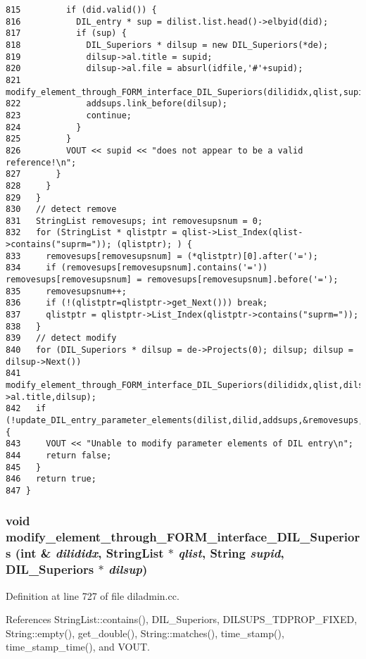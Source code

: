 \begin{verbatim}
815         if (did.valid()) {
816           DIL_entry * sup = dilist.list.head()->elbyid(did);
817           if (sup) {
818             DIL_Superiors * dilsup = new DIL_Superiors(*de);
819             dilsup->al.title = supid;
820             dilsup->al.file = absurl(idfile,'#'+supid);
821             modify_element_through_FORM_interface_DIL_Superiors(dilididx,qlist,supid,dilsup);
822             addsups.link_before(dilsup);
823             continue;
824           }
825         }
826         VOUT << supid << "does not appear to be a valid reference!\n";
827       }
828     }
829   }
830   // detect remove
831   StringList removesups; int removesupsnum = 0;
832   for (StringList * qlistptr = qlist->List_Index(qlist->contains("suprm=")); (qlistptr); ) {
833     removesups[removesupsnum] = (*qlistptr)[0].after('=');
834     if (removesups[removesupsnum].contains('=')) removesups[removesupsnum] = removesups[removesupsnum].before('=');
835     removesupsnum++;
836     if (!(qlistptr=qlistptr->get_Next())) break;
837     qlistptr = qlistptr->List_Index(qlistptr->contains("suprm="));
838   }
839   // detect modify
840   for (DIL_Superiors * dilsup = de->Projects(0); dilsup; dilsup = dilsup->Next())
841     modify_element_through_FORM_interface_DIL_Superiors(dilididx,qlist,dilsup->al.title,dilsup);
842   if (!update_DIL_entry_parameter_elements(dilist,dilid,addsups,&removesups,removesupsnum)) {
843     VOUT << "Unable to modify parameter elements of DIL entry\n";
844     return false;
845   }
846   return true;
847 }
\end{verbatim}\normalsize 
{}
\subsubsection{\setlength{\rightskip}{0pt plus 5cm}void modify\_\-element\_\-through\_\-FORM\_\-interface\_\-DIL\_\-Superiors (int \& {\em dilididx}, {\bf String\-List} $\ast$ {\em qlist}, {\bf String} {\em supid}, DIL\_\-Superiors $\ast$ {\em dilsup})}\label{diladmin_8cc_a11}




Definition at line 727 of file diladmin.cc.

References String\-List::contains(), DIL\_\-Superiors, DILSUPS\_\-TDPROP\_\-FIXED, String::empty(), get\_\-double(), String::matches(), time\_\-stamp(), time\_\-stamp\_\-time(), and VOUT.

